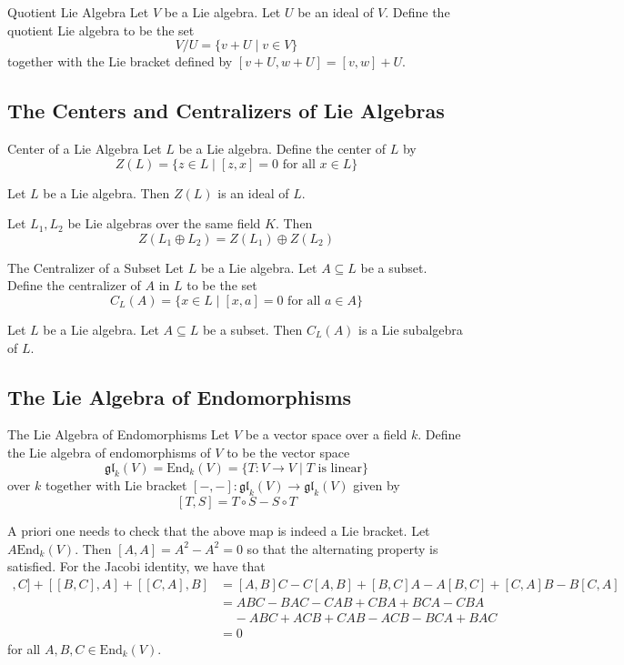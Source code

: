 \documentclass[a4paper]{article}
\begin{document}
\begin{defn}{Quotient Lie Algebra}{} Let $V$ be a Lie algebra. Let $U$ be an ideal of $V$. Define the quotient Lie algebra to be the set $$V/U=\{v+U\;|\;v\in V\}$$ together with the Lie bracket defined by $[v+U,w+U]=[v,w]+U$. 
\end{defn}

\subsection{The Centers and Centralizers of Lie Algebras}
\begin{defn}{Center of a Lie Algebra}{} Let $L$ be a Lie algebra. Define the center of $L$ by $$Z(L)=\{z\in L\;|\;[z,x]=0\text{ for all }x\in L\}$$
\end{defn}

\begin{lmm}{}{} Let $L$ be a Lie algebra. Then $Z(L)$ is an ideal of $L$. 
\end{lmm}

\begin{prp}{}{} Let $L_1,L_2$ be Lie algebras over the same field $K$. Then $$Z(L_1\oplus L_2)=Z(L_1)\oplus Z(L_2)$$
\end{prp}

\begin{defn}{The Centralizer of a Subset}{} Let $L$ be a Lie algebra. Let $A\subseteq L$ be a subset. Define the centralizer of $A$ in $L$ to be the set $$C_L(A)=\{x\in L\;|\;[x,a]=0\text{ for all }a\in A\}$$
\end{defn}

\begin{lmm}{}{} Let $L$ be a Lie algebra. Let $A\subseteq L$ be a subset. Then $C_L(A)$ is a Lie subalgebra of $L$. 
\end{lmm}

\subsection{The Lie Algebra of Endomorphisms}
\begin{defn}{The Lie Algebra of Endomorphisms}{} Let $V$ be a vector space over a field $k$. Define the Lie algebra of endomorphisms of $V$ to be the vector space $$\mathfrak{gl}_k(V)=\text{End}_k(V)=\{T:V\to V\;|\;T\text{ is linear}\}$$ over $k$ together with Lie bracket $[-,-]:\mathfrak{gl}_k(V)\to\mathfrak{gl}_k(V)$ given by $$[T,S]=T\circ S-S\circ T$$
\end{defn}

A priori one needs to check that the above map is indeed a Lie bracket. Let $A\text{End}_k(V)$. Then $[A,A]=A^2-A^2=0$ so that the alternating property is satisfied. For the Jacobi identity, we have that 
\begin{align*}
[[A,B],C]+[[B,C],A]+[[C,A],B]&=[A,B]C-C[A,B]+[B,C]A-A[B,C]+[C,A]B-B[C,A]\\
&=ABC-BAC-CAB+CBA+BCA-CBA\\
&\;\;\;\;-ABC+ACB+CAB-ACB-BCA+BAC\\
&=0
\end{align*}
for all $A,B,C\in\text{End}_k(V)$. 
\end{document}
